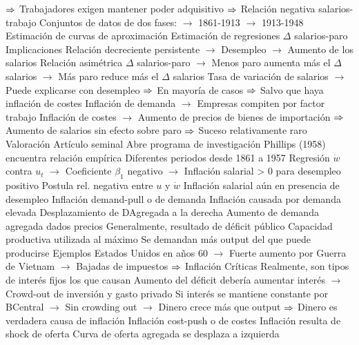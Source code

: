 \documentclass{nuevotema}
\begin{document}
\begin{esquemal}
				\4[] $\Rightarrow$ Trabajadores exigen mantener poder adquisitivo
				\4[] $\Rightarrow$ Relación negativa salarios-trabajo
				\4[] Conjuntos de datos de dos fases:
				\4[] $\to$ 1861-1913
				\4[] $\to$ 1913-1948
				\4[] Estimación de curvas de aproximación
				\4[] Estimación de regresiones $\Delta$ salarios-paro
				\4 Implicaciones
				\4[] Relación decreciente persistente
				\4[] $\to$ Desempleo
				\4[] $\to$ Aumento de los salarios
				\4[] Relación asimétrica $\Delta$ salarios-paro
				\4[] $\to$ Menos paro aumenta más el $\Delta$ salarios
				\4[] $\to$ Más paro reduce más el $\Delta$ salarios
				\4[] Tasa de variación de salarios
				\4[] $\to$ Puede explicarse con desempleo
				\4[] $\Rightarrow$ En mayoría de casos
				\4[] $\Rightarrow$ Salvo que haya inflación de costes
				\4[] Inflación de demanda
				\4[] $\to$ Empresas compiten por factor trabajo
				\4[] Inflación de costes
				\4[] $\to$ Aumento de precios de bienes de importación
				\4[] $\Rightarrow$ Aumento de salarios sin efecto sobre paro
				\4[] $\Rightarrow$ Suceso relativamente raro
				\4 Valoración
				\4[] Artículo seminal
				\4[] Abre programa de investigación
				\4 Phillips (1958) encuentra relación empírica
				\4[] Diferentes periodos desde 1861 a 1957
				\4[] Regresión $\dot{w}$ contra $u_t$
				\4[] 
				\4[] $\to$ Coeficiente $\beta_1$ negativo
				\4[] $\to$ Inflación salarial > 0 para desempleo positivo
				\4[$\Rightarrow$] Postula rel. negativa entre $u$ y $\dot{w}$
				\4[$\Rightarrow$] Inflación salarial aún en presencia de desempleo
				\4[] 
			\3 Inflación demand-pull o de demanda
				\4 Inflación causada por demanda elevada
				\4 Desplazamiento de DAgregada a la derecha
				\4[] Aumento de demanda agregada dados precios
				\4[] Generalmente, resultado de déficit público
				\4 Capacidad productiva utilizada al máximo
				\4[] Se demandan más output del que puede producirse
				\4 Ejemplos
				\4[] Estados Unidos en años 60
				\4[] $\to$ Fuerte aumento por Guerra de Vietnam
				\4[] $\to$ Bajadas de impuestos
				\4[] $\Rightarrow$ Inflación
				\4 Críticas
				\4[] Realmente, son tipos de interés fijos los que causan
				\4[] Aumento del déficit debería aumentar interés
				\4[] $\to$ Crowd-out de inversión y gasto privado
				\4[] Si interés se mantiene constante por BCentral
				\4[] $\to$ Sin crowding out
				\4[] $\to$ Dinero crece más que output
				\4[] $\Rightarrow$ Dinero es verdadera causa de inflación
			\3 Inflación cost-push o de costes
				\4 Inflación resulta de shock de oferta
				\4 Curva de oferta agregada se desplaza a izquierda

\end{esquemal}
\end{document}
